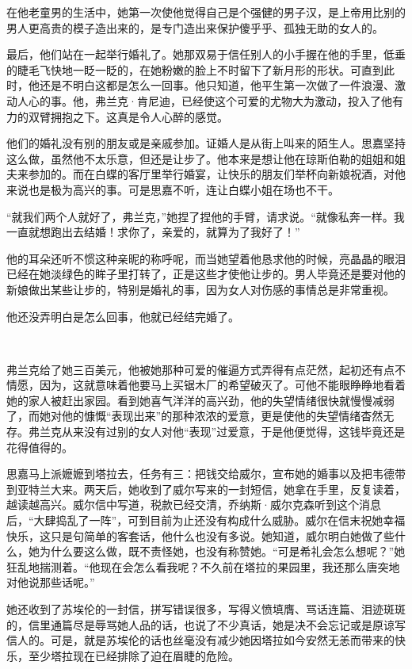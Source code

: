 \par 在他老童男的生活中，她第一次使他觉得自己是个强健的男子汉，是上帝用比别的男人更高贵的模子造出来的，是专门造出来保护傻乎乎、孤独无助的女人的。
\par 最后，他们站在一起举行婚礼了。她那双易于信任别人的小手握在他的手里，低垂的睫毛飞快地一眨一眨的，在她粉嫩的脸上不时留下了新月形的形状。可直到此时，他还是不明白这都是怎么一回事。他只知道，他平生第一次做了一件浪漫、激动人心的事。他，弗兰克·肯尼迪，已经使这个可爱的尤物大为激动，投入了他有力的双臂拥抱之下。这真是令人心醉的感觉。
\par 他们的婚礼没有别的朋友或是亲戚参加。证婚人是从街上叫来的陌生人。思嘉坚持这么做，虽然他不太乐意，但还是让步了。他本来是想让他在琼斯伯勒的姐姐和姐夫来参加的。而在白蝶的客厅里举行婚宴，让快乐的朋友们举杯向新娘祝酒，对他来说也是极为高兴的事。可是思嘉不听，连让白蝶小姐在场也不干。
\par “就我们两个人就好了，弗兰克，”她捏了捏他的手臂，请求说。“就像私奔一样。我一直就想跑出去结婚！求你了，亲爱的，就算为了我好了！”
\par 他的耳朵还听不惯这种亲昵的称呼呢，而当她望着他恳求他的时候，亮晶晶的眼泪已经在她淡绿色的眸子里打转了，正是这些才使他让步的。男人毕竟还是要对他的新娘做出某些让步的，特别是婚礼的事，因为女人对伤感的事情总是非常重视。
\par 他还没弄明白是怎么回事，他就已经结完婚了。
\par  
\par 弗兰克给了她三百美元，他被她那种可爱的催逼方式弄得有点茫然，起初还有点不情愿，因为，这就意味着他要马上买锯木厂的希望破灭了。可他不能眼睁睁地看着她的家人被赶出家园。看到她喜气洋洋的高兴劲，他的失望情绪很快就慢慢减弱了，而她对他的慷慨“表现出来”的那种浓浓的爱意，更是使他的失望情绪杳然无存。弗兰克从来没有过别的女人对他“表现”过爱意，于是他便觉得，这钱毕竟还是花得值得的。
\par 思嘉马上派嬷嬷到塔拉去，任务有三：把钱交给威尔，宣布她的婚事以及把韦德带到亚特兰大来。两天后，她收到了威尔写来的一封短信，她拿在手里，反复读着，越读越高兴。威尔信中写道，税款已经交清，乔纳斯·威尔克森听到这个消息后，“大肆捣乱了一阵”，可到目前为止还没有构成什么威胁。威尔在信末祝她幸福快乐，这只是句简单的客套话，他什么也没有多说。她知道，威尔明白她做了些什么，她为什么要这么做，既不责怪她，也没有称赞她。“可是希礼会怎么想呢？”她狂乱地揣测着。“他现在会怎么看我呢？不久前在塔拉的果园里，我还那么唐突地对他说那些话呢。”
\par 她还收到了苏埃伦的一封信，拼写错误很多，写得义愤填膺、骂话连篇、泪迹斑斑的，信里通篇尽是辱骂她人品的话，也说了不少真话，她是决不会忘记或是原谅写信人的。可是，就是苏埃伦的话也丝毫没有减少她因塔拉如今安然无恙而带来的快乐，至少塔拉现在已经排除了迫在眉睫的危险。
